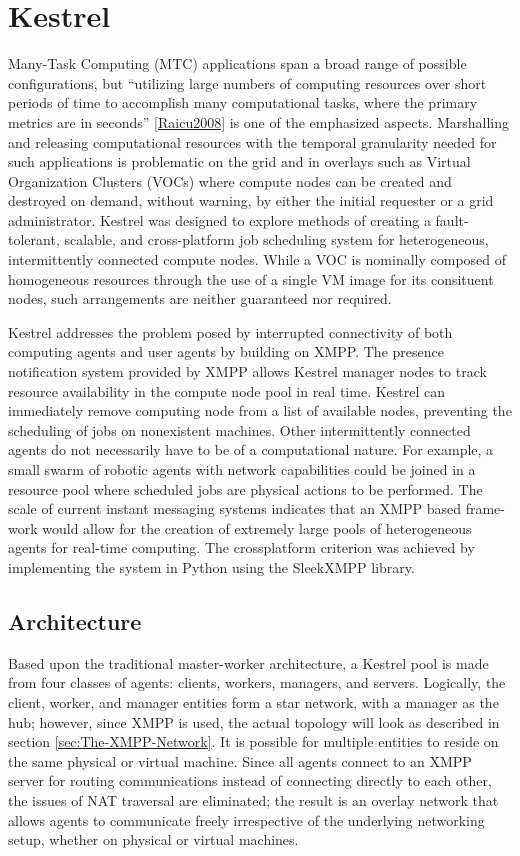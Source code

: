 \chapter{Kestrel}
\label{chap:Kestrel} 

Many-Task Computing (MTC) applications span a broad range of possible
configurations, but ``utilizing large numbers of computing resources over short
periods of time to accomplish many computational tasks, where the primary
metrics are in seconds'' \ref{Raicu2008} is one of the emphasized aspects.
Marshalling and releasing computational resources with the temporal granularity
needed for such applications is problematic on the grid and in overlays such
as Virtual Organization Clusters (VOCs) where compute nodes can be created
and destroyed on demand, without warning, by either the initial requester or
a grid administrator. Kestrel was designed to explore methods of creating
a fault-tolerant, scalable, and cross-platform job scheduling system for
heterogeneous, intermittently connected compute nodes. While a VOC is nominally
composed of homogeneous resources through the use of a single VM image for its
consituent nodes, such arrangements are neither guaranteed nor required.

Kestrel addresses the problem posed by interrupted connectivity of both
computing agents and user agents by building on XMPP. The presence notification
system provided by XMPP allows Kestrel manager nodes to track resource
availability in the compute node pool in real time. Kestrel can immediately
remove computing node from a list of available nodes, preventing the scheduling
of jobs on nonexistent machines. Other intermittently connected agents do not
necessarily have to be of a computational nature. For example, a small swarm
of robotic agents with network capabilities could be joined in a resource pool
where scheduled jobs are physical actions to be performed. The scale of current
instant messaging systems indicates that an XMPP based frame- work would allow
for the creation of extremely large pools of heterogeneous agents for real-time
computing. The crossplatform criterion was achieved by implementing the system
in Python using the SleekXMPP \cite{SleekXMPP} library.

\section{Architecture}
Based upon the traditional master-worker architecture, a Kestrel pool is made
from four classes of agents: clients, workers, managers, and servers. Logically,
the client, worker, and manager entities form a star network, with a manager as
the hub; however, since XMPP is used, the actual topology will look as described
in section \ref{sec:The-XMPP-Network}. It is possible for multiple entities to
reside on the same physical or virtual machine. Since all agents connect to an
XMPP server for routing communications instead of connecting directly to each
other, the issues of NAT traversal are eliminated; the result is an overlay
network that allows agents to communicate freely irrespective of the underlying
networking setup, whether on physical or virtual machines.

